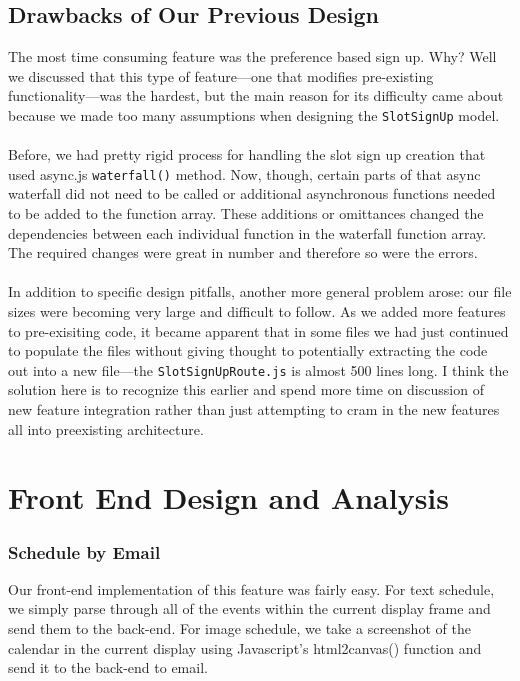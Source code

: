 \documentclass[11pt]{article}   %
\begin{document}
\subsection{Drawbacks of Our Previous Design}
The most time consuming feature was the preference based sign up. Why? Well we discussed that this type of feature---one that modifies pre-existing functionality---was the hardest, but the main reason for its difficulty came about because we made too many assumptions when designing the \texttt{SlotSignUp} model.\\~\\
Before, we had pretty rigid process for handling the slot sign up creation that used async.js \texttt{waterfall()} method. Now, though, certain parts of that async waterfall did not need to be called or additional asynchronous functions needed to be added to the function array. These additions or omittances changed the dependencies between each individual function in the waterfall function array. The required changes were great in number and therefore so were the errors. \\~\\
In addition to specific design pitfalls, another more general problem arose: our file sizes were becoming very large and difficult to follow. As we added more features to pre-exisiting code, it became apparent that in some files we had just continued to populate the files without giving thought to potentially extracting the code out into a new file---the \texttt{SlotSignUpRoute.js} is almost 500 lines long. I think the solution here is to recognize this earlier and spend more time on discussion of new feature integration rather than just attempting to cram in the new features all into preexisting architecture. 

\section{Front End Design and Analysis}

\subsubsection{Schedule by Email}
Our front-end implementation of this feature was fairly easy. For text schedule, we simply parse through all of the events within the current display frame and send them to the back-end. For image schedule, we take a screenshot of the calendar in the current display using Javascript's html2canvas() function and send it to the back-end to email.
\end{document}

